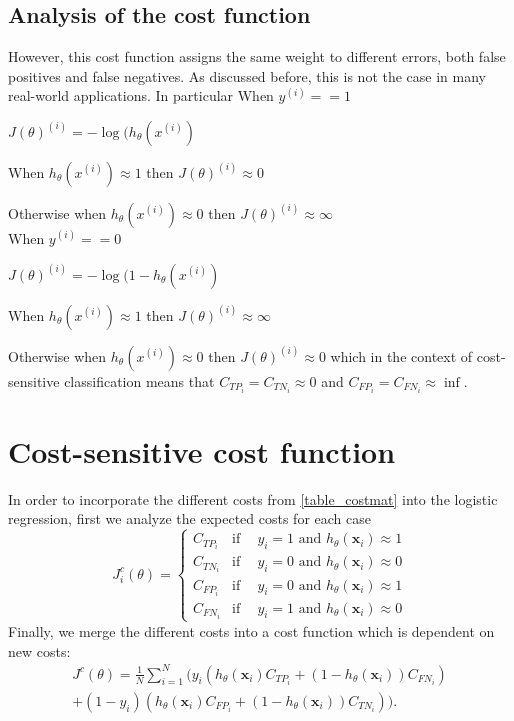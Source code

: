 	\subsection{Analysis of the cost function}
	However, this cost function assigns the same 
  weight to different errors, both false positives and false negatives. As discussed before, this 
  is not the case in many real-world applications. In particular
			\quad When  $y^{(i)}==1$
			
			\quad $J(\theta)^{(i)}=-\log(h_\theta(x^{(i)})$
			
			\quad When $h_\theta(x^{(i)})\approx1$ then $J(\theta)^{(i)}\approx0$
			
			\quad Otherwise when $h_\theta(x^{(i)})\approx0$ then
			$J(\theta)^{(i)}\approx\infty$ \\

			When $y^{(i)}==0$
			
			\quad $J(\theta)^{(i)}=-\log(1-h_\theta(x^{(i)})$
			
			\quad\quad When $h_\theta(x^{(i)})\approx1$ then
			$J(\theta)^{(i)}\approx\infty$ 

			\quad\quad Otherwise when $h_\theta(x^{(i)})\approx0$ then
			$J(\theta)^{(i)}\approx0$ 
  which in the context of cost-sensitive classification means that $C_{TP_i}=C_{TN_i}\approx 0$ and 
  $C_{FP_i}=C_{FN_i}\approx \inf$.
	
	
\section{Cost-sensitive cost function}
  In order to incorporate the different costs from \tablename{ \ref{table_costmat}} into the 
  logistic regression, first we analyze the expected costs for each case
  \begin{equation*}
    J^c_i(\theta) = 
    \begin{cases}
      C_{TP_i}    & \text{if} \phantom{-}  y_i = 1 \text{ and } h_\theta(\mathbf{x}_i) \approx 1  \\
      C_{TN_i}    & \text{if} \phantom{-}  y_i = 0 \text{ and } h_\theta(\mathbf{x}_i) \approx 0  \\
      C_{FP_i}    & \text{if} \phantom{-}  y_i = 0 \text{ and } h_\theta(\mathbf{x}_i) \approx 1  \\
      C_{FN_i}    & \text{if} \phantom{-}  y_i = 1 \text{ and } h_\theta(\mathbf{x}_i) \approx 0 
    \end{cases}
  \end{equation*}
  Finally, we merge the different costs into a cost function which is dependent on new costs:
  \begin{align}\label{eq:CSLR}
    J^c(\theta)=\frac{1}{N} \sum_{i=1}^{N} \bigg( y_i(h_\theta(\mathbf{x}_i) C_{TP_i} + 
    (1-h_\theta(\mathbf{x}_i))C_{FN_i})  \nonumber\\ 
    +(1-y_i)(h_\theta(\mathbf{x}_i) C_{FP_i} + (1-h_\theta(\mathbf{x}_i))C_{TN_i}) \bigg).
  \end{align}
  
